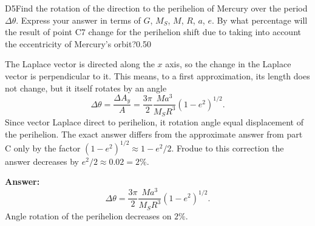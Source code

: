 \documentclass[11pt,a4paper]{article}
\begin{document}
\begin{solcard}{D5}{Find the rotation of the direction to the perihelion of Mercury over the period $\Delta \theta$. Express your answer in terms of $G$, $M_S$, $M$, $R$, $a$, $e$. By what percentage will the result of point C7 change for the perihelion shift due to taking into account the eccentricity of Mercury's orbit?}{0.50}

The Laplace vector is directed along the $x$ axis, so the change in the Laplace vector is perpendicular to it. This means, to a first approximation, its length does not change, but it itself rotates by an angle $$ \Delta \theta = \frac{\Delta A_y}{A} = \frac{3\pi }{2} \frac{M a^3}{M_S R^3} (1 - e^2)^{1/2}. $$Since vector Laplace direct to perihelion, it rotation angle equal displacement of the perihelion. The exact answer differs from the approximate answer from part C only by the factor $(1 - e^2)^{1/2} \approx 1 - e^2/2$. Frodue to this correction the answer decreases by $e^2/2 \approx 0.02 = 2\%$.

\par\smallskip\noindent\textbf{Answer:} $$ \Delta \theta =  \frac{3\pi }{2} \frac{M a^3}{M_S R^3} (1 - e^2)^{1/2}. $$ Angle rotation of the perihelion decreases on $2 \%$.
\end{solcard}
\end{document}
